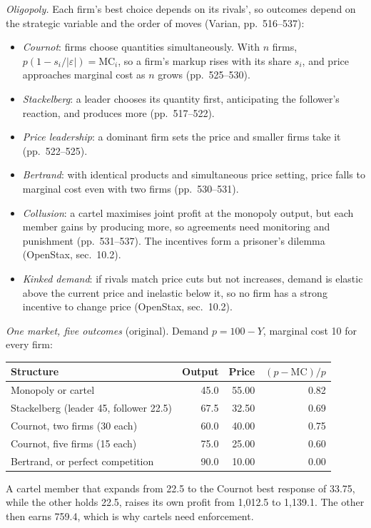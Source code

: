 \begin{qfdefinition}
\emph{Oligopoly.} Each firm's best choice depends on its rivals', so outcomes depend on the strategic variable and the order of moves (Varian, pp.~516--537):
\begin{itemize}
\item \emph{Cournot}: firms choose quantities simultaneously. With $n$ firms, $p(1-s_i/|\varepsilon|)=\mathrm{MC}_i$, so a firm's markup rises with its share $s_i$, and price approaches marginal cost as $n$ grows (pp.~525--530).
\item \emph{Stackelberg}: a leader chooses its quantity first, anticipating the follower's reaction, and produces more (pp.~517--522).
\item \emph{Price leadership}: a dominant firm sets the price and smaller firms take it (pp.~522--525).
\item \emph{Bertrand}: with identical products and simultaneous price setting, price falls to marginal cost even with two firms (pp.~530--531).
\item \emph{Collusion}: a cartel maximises joint profit at the monopoly output, but each member gains by producing more, so agreements need monitoring and punishment (pp.~531--537). The incentives form a prisoner's dilemma (OpenStax, sec.~10.2).
\item \emph{Kinked demand}: if rivals match price cuts but not increases, demand is elastic above the current price and inelastic below it, so no firm has a strong incentive to change price (OpenStax, sec.~10.2).
\end{itemize}

 \emph{One market, five outcomes} (original). Demand $p=100-Y$, marginal cost 10 for every firm:
\begin{center}\small
\begin{tabular}{@{}lrrr@{}}
\toprule
Structure & Output & Price & $(p-\mathrm{MC})/p$ \\
\midrule
Monopoly or cartel & 45.0 & 55.00 & 0.82 \\
Stackelberg (leader 45, follower 22.5) & 67.5 & 32.50 & 0.69 \\
Cournot, two firms (30 each) & 60.0 & 40.00 & 0.75 \\
Cournot, five firms (15 each) & 75.0 & 25.00 & 0.60 \\
Bertrand, or perfect competition & 90.0 & 10.00 & 0.00 \\
\bottomrule
\end{tabular}
\end{center}
A cartel member that expands from 22.5 to the Cournot best response of 33.75, while the other holds 22.5, raises its own profit from 1,012.5 to 1,139.1. The other then earns 759.4, which is why cartels need enforcement.


\end{qfdefinition}
